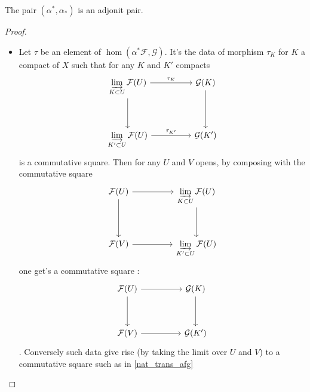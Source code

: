 \begin{proposition}\label{pro:adj_kprshv_and_prshv}
    The pair $(\alpha^*,\alpha_*)$ is an adjonit pair.
\end{proposition}

\begin{proof}
    \begin{itemize}
        \item Let $\tau$ be an element of $\hom(\alpha^*\mathcal{F},\mathcal{G})$. It's the data of morphism $\tau_K$ for $K$ a compact of $X$ such that for any $K$ and $K'$ compacts 
\begin{equation}\label{nat_trans_afg}\begin{tikzcd}
	{\varinjlim\limits_{K\subset U}\mathcal{F}(U)} && {\mathcal{G}(K)} \\
	\\
	{\varinjlim\limits_{K'\subset U}\mathcal{F}(U)} && {\mathcal{G}(K')}
	\arrow["{\tau_K}", from=1-1, to=1-3]
	\arrow[from=1-1, to=3-1]
	\arrow[from=1-3, to=3-3]
	\arrow["{\tau_{K'}}", from=3-1, to=3-3]
\end{tikzcd}\end{equation} is a commutative square. Then for any $U$ and $V$ opens,  by composing with the commutative square %
$$\begin{tikzcd}
	{\mathcal{F}(U)} && {\varinjlim\limits_{K\subset U}\mathcal{F}(U)} \\
	\\
	{\mathcal{F}(V)} && {\varinjlim\limits_{K'\subset U}\mathcal{F}(U)}
	\arrow[from=1-1, to=1-3]
	\arrow[from=1-1, to=3-1]
	\arrow[from=1-3, to=3-3]
	\arrow[from=3-1, to=3-3]
\end{tikzcd}$$ one get's a commutative square :%
\begin{equation}\label{data_adj}\begin{tikzcd}
	{\mathcal{F}(U)} && {\mathcal{G}(K)} \\
	\\
	{\mathcal{F}(V)} && {\mathcal{G}(K')}
	\arrow[from=1-1, to=1-3]
	\arrow[from=1-1, to=3-1]
	\arrow[from=1-3, to=3-3]
	\arrow[from=3-1, to=3-3]
\end{tikzcd}\end{equation}. Conversely such data give rise (by taking the limit over $U$ and $V$) to a commutative square such as in \eqref{nat_trans_afg}


\end{itemize}
\end{proof}
